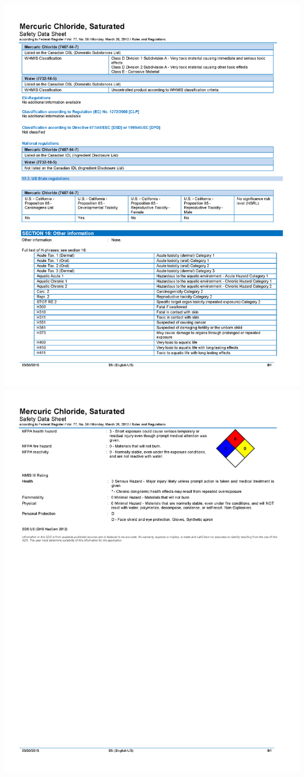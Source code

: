 \documentclass[]{book}
\begin{document}
\includegraphics[width=1\textwidth,height=\textheight]{images/Saturated-Mercuric-Chloride-SDS_Page_8.png}
\includegraphics[width=1\textwidth,height=\textheight]{images/Saturated-Mercuric-Chloride-SDS_Page_9.png}
\end{document}
